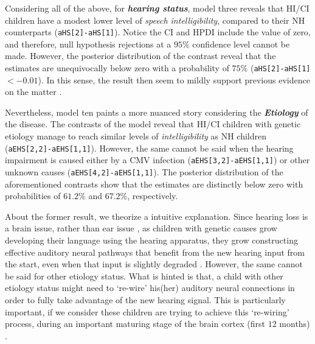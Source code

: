 Considering all of the above, for \textbf{\textit{hearing status}}, model three reveals that HI/CI children have a modest lower level of \textit{speech intelligibility}, compared to their NH counterparts (\texttt{aHS[2]-aHS[1]}). Notice the CI and HPDI include the value of zero, and therefore, null hypothesis rejections at a $95\%$ confidence level cannot be made. However, the posterior distribution of the contrast reveal that the estimates are unequivocally below zero with a probability of $75\%$ (\texttt{aHS[2]-aHS[1]} $< -0.01$). In this sense, the result then seem to mildly support previous evidence on the matter \cite{Nicholas_et_al_2007, Castellanos_et_al_2014, Chin_et_al_2014, Geers_et_al_2016, Freeman_et_al_2017, Duchesne_et_al_2019, Grandon_et_al_2020}. 

Nevertheless, model ten paints a more nuanced story considering the \textbf{\textit{Etiology}} of the disease. The contrasts of the model reveal that HI/CI children with genetic etiology manage to reach similar levels of \textit{intelligibility} as NH children (\texttt{aEHS[2,2]-aEHS[1,1]}). However, the same cannot be said when the hearing impairment is caused either by a CMV infection (\texttt{aEHS[3,2]-aEHS[1,1]}) or other unknown causes (\texttt{aEHS[4,2]-aEHS[1,1]}). The posterior distribution of the aforementioned contrasts show that the estimates are distinctly below zero with probabilities of $61.2\%$ and $67.2\%$, respectively.

About the former result, we theorize a intuitive explanation. Since hearing loss is a brain issue, rather than ear issue \cite{Flexer_2011}, as children with genetic causes grow developing their language using the hearing apparatus, they grow constructing effective auditory neural pathways that benefit from the new hearing input from the start, even when that input is slightly degraded \cite{Drennan_et_al_2008}. However, the same cannot be said for other etiology status. What is hinted is that, a child with other etiology status might need to `re-wire' his(her) auditory neural connections in order to fully take advantage of the new hearing signal. This is particularly important, if we consider these children are trying to achieve this `re-wiring' process, during an important maturing stage of the brain cortex (first $12$ months) \cite{Flexer_2011}.

